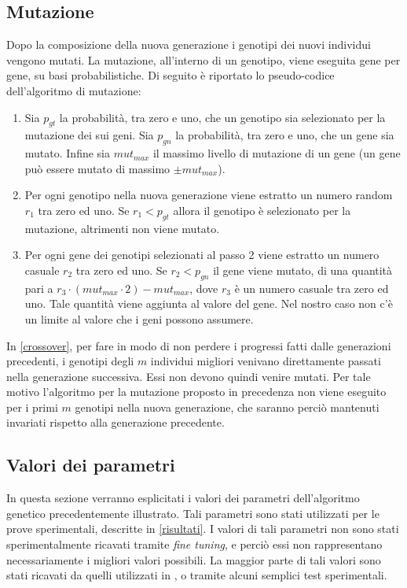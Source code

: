 \documentclass[a4paper,12pt]{article}
\begin{document}
\subsection{Mutazione} \label{mutazione}
Dopo la composizione della nuova generazione i genotipi dei nuovi individui vengono mutati. La mutazione, all'interno di un genotipo, viene eseguita gene per gene, su basi probabilistiche. Di seguito è riportato lo pseudo-codice dell'algoritmo di mutazione:
\begin{enumerate}
	\item Sia $p_{gt}$ la probabilità, tra zero e uno, che un genotipo sia selezionato per la mutazione dei sui geni. Sia $p_{gn}$ la probabilità, tra zero e uno, che un gene sia mutato. Infine sia $mut_{max}$ il massimo livello di mutazione di un gene (un gene può essere mutato di massimo $\pm mut_{max}$).
	\item Per ogni genotipo nella nuova generazione viene estratto un numero random $r_1$ tra zero ed uno. Se $r_1 < p_{gt}$ allora il genotipo è selezionato per la mutazione, altrimenti non viene mutato.
	\item Per ogni gene dei genotipi selezionati al passo 2 viene estratto un numero casuale $r_2$ tra zero ed uno. Se $r_2 < p_{gn}$ il gene viene mutato, di una quantità pari a $r_3 \cdot (mut_{max} \cdot 2) - mut_{max}$, dove $r_3$ è un numero casuale tra zero ed uno. Tale quantità viene aggiunta al valore del gene. Nel nostro caso non c'è un limite al valore che i geni possono assumere. 
\end{enumerate}
In \autoref{crossover}, per fare in modo di non perdere i progressi fatti dalle generazioni precedenti, i genotipi degli $m$ individui migliori venivano direttamente passati nella generazione successiva. Essi non devono quindi venire mutati. Per tale motivo l'algoritmo per la mutazione proposto in precedenza non viene eseguito per i primi $m$ genotipi nella nuova generazione, che saranno perciò mantenuti invariati rispetto alla generazione precedente.
\subsection{Valori dei parametri} \label{valore-dei-parametri}
In questa sezione verranno esplicitati i valori dei parametri dell'algoritmo genetico precedentemente illustrato. Tali parametri sono stati utilizzati per le prove sperimentali, descritte in \autoref{risultati}. I valori di tali parametri non sono stati sperimentalmente ricavati tramite \emph{fine tuning}, e perciò essi non rappresentano necessariamente i migliori valori possibili. La maggior parte di tali valori sono stati ricavati da quelli utilizzati in \cite{arztRepo}, o tramite alcuni semplici test sperimentali.
\end{document}
